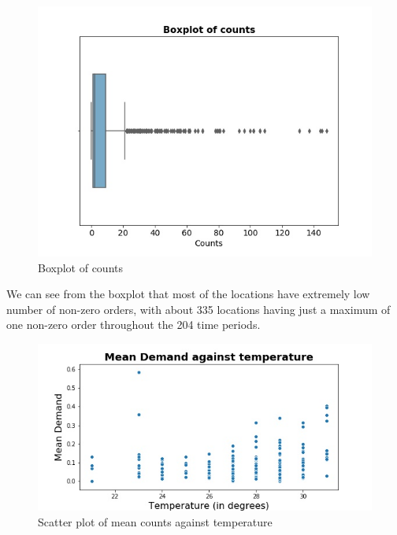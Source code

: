 \documentclass[10pt, letterpaper] {article}
\begin{document}
\begin{figure}[H]
    \centering
    \includegraphics[width=\textwidth]{Images/boxplot_counts.jpg}
    \caption{Boxplot of counts}
    \label{fig:Boxplot of counts}
\end{figure}
We can see from the boxplot that most of the locations have extremely low number of non-zero orders, with about 335 locations having just a maximum of one non-zero order throughout the 204 time periods. 

\begin{figure}[H]
    \centering
    \includegraphics[width=\textwidth]{Images/temp_mean_demand.jpg}
    \caption{Scatter plot of mean counts against temperature}
    \label{fig:Scatter plot of mean counts against temperature}
\end{figure}
\end{document}
